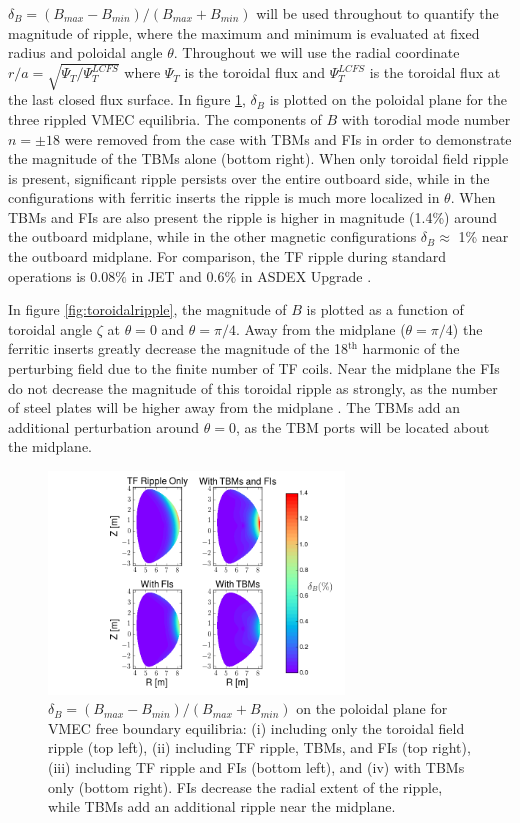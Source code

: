 \documentclass{article}
\begin{document}
$\delta_B = (B_{max}-B_{min})/(B_{max} + B_{min})$ will be used throughout to quantify the magnitude of ripple, where the maximum and minimum is evaluated at fixed radius and poloidal angle $\theta$. Throughout we will use the radial coordinate $r/a = \sqrt{\Psi_T/\Psi_T^{LCFS}}$ where $\Psi_T$ is the toroidal flux and $\Psi_T^{LCFS}$ is the toroidal flux at the last closed flux surface. In figure \ref{fig:ripplecontour}, $\delta_B$ is plotted on the poloidal plane for the three rippled VMEC equilibria. The components of $B$ with torodial mode number $n = \pm 18$ were removed from the case with TBMs and FIs in order to demonstrate the magnitude of the TBMs alone (bottom right). When only toroidal field ripple is present, significant ripple persists over the entire outboard side, while in the configurations with ferritic inserts the ripple is much more localized in $\theta$. When TBMs and FIs are also present the ripple is higher in magnitude (1.4\%) around the outboard midplane, while in the other magnetic configurations $\delta_B \approx$ 1\% near the outboard midplane. For comparison, the TF ripple during standard operations is $0.08\%$ in JET \cite{DeVries2008} and $0.6\%$ in ASDEX Upgrade \cite{Martitsch2016}. 

In figure \ref{fig:toroidalripple}, the magnitude of $B$ is plotted as a function of toroidal angle $\zeta$ at $\theta = 0$ and $\theta = \pi/4$. Away from the midplane ($\theta = \pi/4$) the ferritic inserts greatly decrease the magnitude of the 18$^{\text{th}}$ harmonic of the perturbing field due to the finite number of TF coils. Near the midplane the FIs do not decrease the magnitude of this toroidal ripple as strongly, as the number of steel plates will be higher away from the midplane \cite{Shinohara2009}. The TBMs add an additional perturbation around $\theta = 0$, as the TBM ports will be located about the midplane. 

\FloatBarrier

\begin{figure}[h!]
\centering
\includegraphics[width=0.7\textwidth]{ripplecontour.png}
\caption{\label{fig:ripplecontour} $\delta_B = (B_{max}-B_{min})/(B_{max} + B_{min})$ on the poloidal plane for VMEC free boundary equilibria: (i) including only the toroidal field ripple (top left), (ii) including TF ripple, TBMs, and FIs (top right), (iii) including TF ripple and FIs (bottom left), and (iv) with TBMs only (bottom right). FIs decrease the radial extent of the ripple, while TBMs add an additional ripple near the midplane.}
\end{figure}
\end{document}
